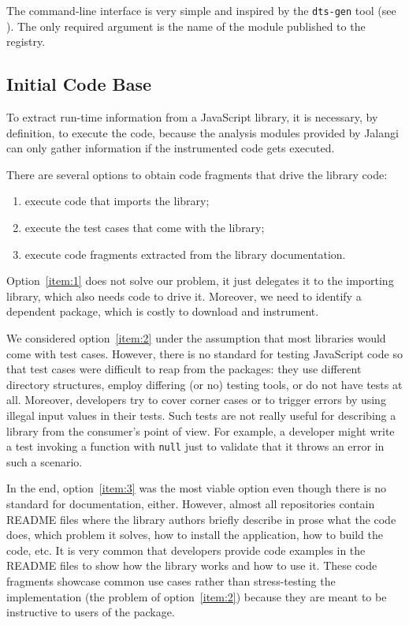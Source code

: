 \documentclass[sigconf]{acmart}
\begin{document}
The command-line interface is very simple and inspired by the \texttt{dts-gen} tool
\cite{dts-gen} (see ). The only required
argument is the name of the module published to the \NPM{} registry. 

\subsection{Initial Code Base}
\label{sec:initial-code-base}

To extract run-time information from a JavaScript library, it is
necessary, by definition, to execute the code, because the
analysis modules provided by Jalangi can only gather information if the instrumented code gets executed.

There are several options to obtain code fragments that drive the
library code:
\begin{enumerate}
\item\label{item:1} execute code that imports the library;
\item\label{item:2} execute the test cases that come with the library;
\item\label{item:3} execute code fragments extracted from the library documentation.
\end{enumerate}

Option~\ref{item:1} does not solve our problem, it just delegates it
to the importing library, which also needs code to drive it. Moreover,
we need to identify a dependent package, which is costly to download and instrument.

We considered option~\ref{item:2} under the assumption that most
libraries would come with test cases. However, there is no standard
for testing JavaScript code so that test cases were difficult to reap
from the \NPM{} packages: they use different directory structures,
employ differing (or no) testing tools, or do not have tests
at all. Moreover, developers try to cover corner cases or to trigger errors by using illegal
input values in their tests. Such tests are not really useful for describing a library
from the consumer's point of view. For example, a developer might write a test invoking a
function with \texttt{null} just to validate that it throws an error
in such a scenario. 

In the end, option~\ref{item:3} was the most viable option even though there
is no standard for documentation, either. However, almost all repositories
contain README files where the library authors briefly describe in prose what
the code does, which problem it solves, how to install the
application, how to build the code, etc. It is very common that
developers provide code examples in the README files to show how the
library works and how to use it. These code fragments showcase common use cases rather
than stress-testing the implementation (the problem of
option~\ref{item:2}) because they are meant to be instructive to users of the package.  
\end{document}

